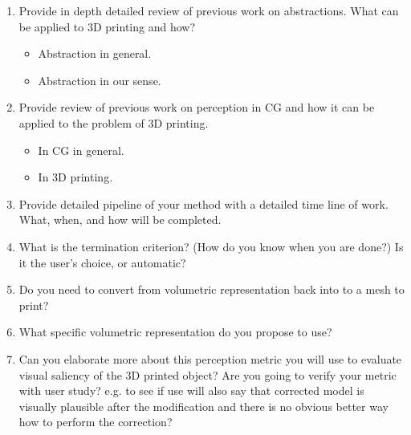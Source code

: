 \begin{enumerate}
	\item Provide in depth detailed review of previous work on abstractions. What can be applied to 3D printing and how?
	
	\begin{itemize}
		\item Abstraction in general.
		\item Abstraction in our sense.
	\end{itemize}

  \item Provide review of previous work on perception in CG and how it can be applied to the problem of 3D printing.
	
	\begin{itemize}
		\item In CG in general.
		\item In 3D printing.
	\end{itemize}

  \item Provide detailed pipeline of your method with a detailed time line of work. What, when, and how will be completed.
	
	
	\item What is the termination criterion? (How do you know when you are done?) Is it the user's choice, or automatic?

  \item Do you need to convert from volumetric representation back into to a mesh to print?

  \item What specific volumetric representation do you propose to use?

	\item Can you elaborate more about this perception metric you will use to evaluate visual saliency of the 3D printed object? Are you going to verify your metric with user study? e.g. to see if use will also say that corrected model is visually plausible after the modification and there is no obvious better way how to perform the correction?
	

\end{enumerate}

